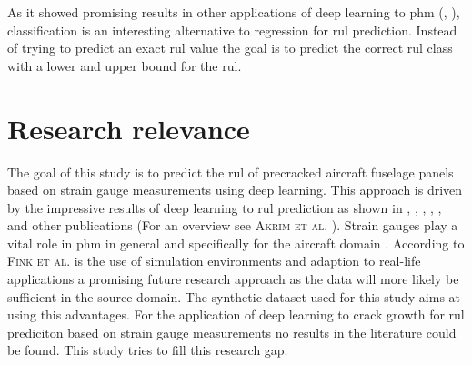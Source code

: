 \documentclass[conference]{IEEEtran}
\begin{document}

As it showed promising results in other applications of deep learning to \gls{phm} (\cite{Liu2019a}, \cite{Xiao2016}), classification is an interesting alternative to regression for \gls{rul} prediction. Instead of trying to predict an exact \gls{rul} value the goal is to predict the correct \gls{rul} class with a lower and upper bound for the \gls{rul}.

\section{Research relevance}
\label{sec:research-relevance}

The goal of this study is to predict the \gls{rul} of precracked aircraft fuselage panels based on strain gauge measurements using deep learning. This approach is driven by the impressive results of deep learning to \gls{rul} prediction as shown in \cite{Xu2018}, \cite{LI20181}, \cite{Liu2019}, \cite{Yuan2016}, \cite{Wu2018}, \cite{Park2020} and other publications (For an overview see \textsc{Akrim et al.} \cite{Akrim2021}). Strain gauges play a vital role in \gls{phm} in general \cite{Tinga2019} and specifically for the aircraft domain \cite{Timothy2009}. According to \textsc{Fink et al.} \cite{Fink2020} is the use of simulation environments and adaption to real-life applications a promising future research approach as the data will more likely be sufficient in the source domain. The synthetic dataset used for this study aims at using this advantages. For the application of deep learning to crack growth for \gls{rul} prediciton based on strain gauge measurements no results in the literature could be found. This study tries to fill this research gap.




\end{document}
